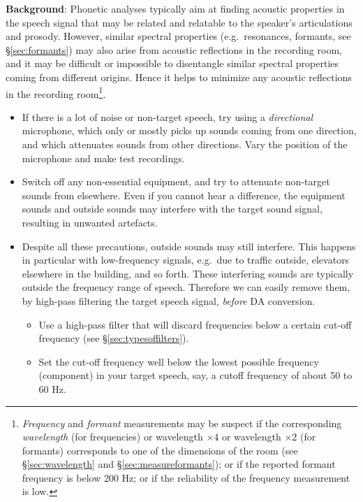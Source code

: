 \documentclass[
]{book}
\providecommand{\tightlist}{%
  \setlength{\itemsep}{0pt}\setlength{\parskip}{0pt}}
\begin{document}
\textbf{Background}: Phonetic analyses typically aim at finding acoustic properties in the speech signal that may be related and relatable to the speaker's articulations and prosody. However, similar spectral properties (e.g.~resonances, formants, see §\ref{sec:formants}) may also arise from acoustic reflections in the recording room, and it may be difficult or impossible to disentangle similar spectral properties coming from different origins. Hence it helps to minimize any acoustic reflections in the recording room\footnote{\emph{Frequency} and \emph{formant} measurements may be suspect if the corresponding \emph{wavelength} (for frequencies) or wavelength \(\times 4\) or wavelength \(\times 2\) (for formants) corresponds to one of the dimensions of the room (see §\ref{sec:wavelength} and §\ref{sec:measureformants}); or if the reported formant frequency is below 200 Hz; or if the reliability of the frequency measurement is low.}.

\begin{itemize}
\item
  If there is a lot of noise or non-target speech, try using a \emph{directional} microphone, which only or mostly picks up sounds coming from one direction, and which attenuates sounds from other directions. Vary the position of the microphone and make test recordings.
\item
  Switch off any non-essential equipment, and try to attenuate non-target sounds from elsewhere. Even if you cannot hear a difference, the equipment sounds and outside sounds may interfere with the target sound signal, resulting in unwanted artefacts.
\item
  Despite all these precautions, outside sounds may still interfere. This happens in particular with low-frequency signals, e.g.~due to traffic outside, elevators elsewhere in the building, and so forth. These interfering sounds are typically outside the frequency range of speech. Therefore we can easily remove them, by high-pass filtering the target speech signal, \emph{before} DA conversion.

  \begin{itemize}
  \tightlist
  \item
    Use a high-pass filter that will discard frequencies below a certain cut-off frequency (see §\ref{sec:typesoffilters}).
  \item
    Set the cut-off frequency well below the lowest possible frequency (component) in your target speech, say, a cutoff frequency of about 50 to 60 Hz.
  \end{itemize}
\end{itemize}
\end{document}
